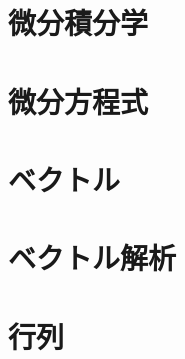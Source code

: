 \chapter{微分積分学}
        

\chapter{微分方程式}
        

\chapter{ベクトル}
        

\chapter{ベクトル解析}
        

\chapter{行列}
        
